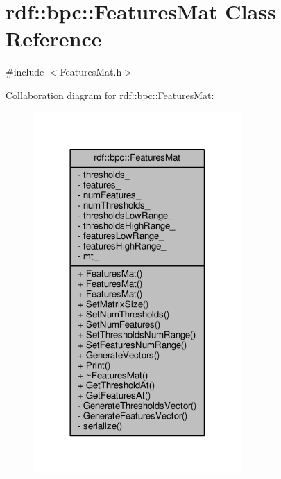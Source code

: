 \hypertarget{classrdf_1_1bpc_1_1FeaturesMat}{}\section{rdf\+:\+:bpc\+:\+:Features\+Mat Class Reference}
\label{classrdf_1_1bpc_1_1FeaturesMat}


{\ttfamily \#include $<$Features\+Mat.\+h$>$}



Collaboration diagram for rdf\+:\+:bpc\+:\+:Features\+Mat\+:
\nopagebreak
\begin{figure}[H]
\begin{center}
\leavevmode
\includegraphics[width=225pt]{classrdf_1_1bpc_1_1FeaturesMat__coll__graph}
\end{center}
\end{figure}
